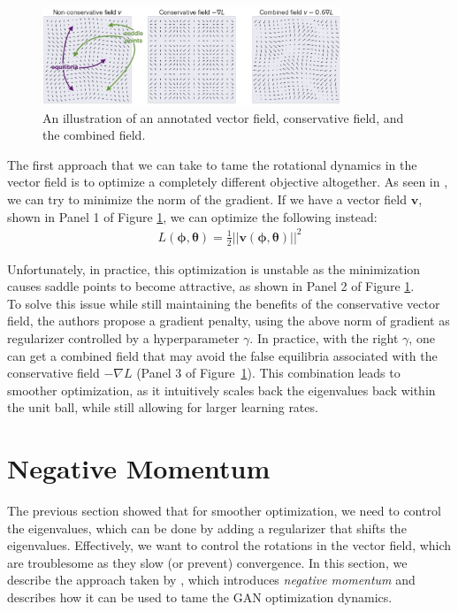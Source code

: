\documentclass{article}
\renewcommand{\vec}[1]{\ensuremath{\boldsymbol{#1}}}
\begin{document}
\begin{figure}[h!]
    \centering
    \includegraphics[width=0.8\textwidth]{vectorfieldnog17.png}
    \caption{An illustration of an annotated vector field, conservative field, and the combined field.}
    \label{fig:vfnog}
\end{figure}

The first approach that we can take to tame the rotational dynamics in the vector field is to optimize a completely different objective altogether. As seen in \cite{MeschederNG17a}, we can try to minimize the norm of the gradient. If we have a vector field $\vec{v}$, shown in Panel 1 of Figure \ref{fig:vfnog}, we can optimize the following instead:
\begin{align}
    L(\vec{\phi}, \vec{\theta}) = \frac{1}{2}||\vec{v}(\vec{\phi}, \vec{\theta})||^2
\end{align}

Unfortunately, in practice, this optimization is unstable as the minimization causes saddle points to become attractive, as shown in Panel 2 of Figure \ref{fig:vfnog}.
\\

To solve this issue while still maintaining the benefits of the conservative vector field, the authors propose a gradient penalty, using the above norm of gradient as regularizer controlled by a hyperparameter $\gamma$. In practice, with the right $\gamma$, one can get a combined field that may avoid the false equilibria associated with the conservative field $-\nabla L$ (Panel 3 of Figure~\ref{fig:vfnog}). This combination leads to smoother optimization, as it intuitively scales back the eigenvalues back within the unit ball, while still allowing for larger learning rates.

\section{Negative Momentum}

The previous section showed that for smoother optimization, we need to control the eigenvalues, which can be done by adding a regularizer that shifts the eigenvalues. Effectively, we want to control the rotations in the vector field, which are troublesome as they slow (or prevent) convergence. In this section, we describe the approach taken by \cite{Gidel18NegMom}, which introduces \textit{negative momentum} and describes how it can be used to tame the GAN optimization dynamics.
\end{document}
